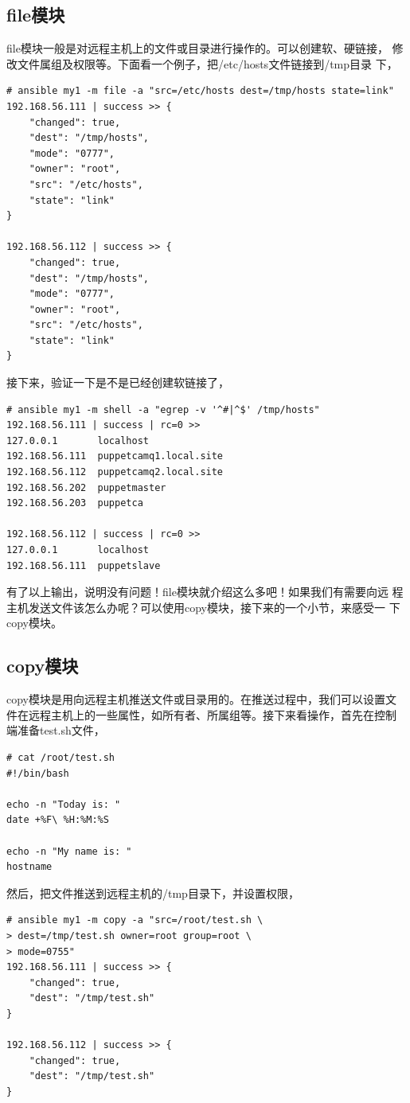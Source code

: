 \subsection{file模块}
\label{sec:AnsibleFileMod}

file模块一般是对远程主机上的文件或目录进行操作的。可以创建软、硬链接，
修改文件属组及权限等。下面看一个例子，把/etc/hosts文件链接到/tmp目录
下，
\begin{verbatim}
# ansible my1 -m file -a "src=/etc/hosts dest=/tmp/hosts state=link"
192.168.56.111 | success >> {
    "changed": true, 
    "dest": "/tmp/hosts", 
    "mode": "0777", 
    "owner": "root", 
    "src": "/etc/hosts", 
    "state": "link"
}

192.168.56.112 | success >> {
    "changed": true, 
    "dest": "/tmp/hosts", 
    "mode": "0777", 
    "owner": "root", 
    "src": "/etc/hosts", 
    "state": "link"
}
\end{verbatim}

接下来，验证一下是不是已经创建软链接了，

\begin{verbatim}
# ansible my1 -m shell -a "egrep -v '^#|^$' /tmp/hosts"
192.168.56.111 | success | rc=0 >>
127.0.0.1	    localhost 
192.168.56.111  puppetcamq1.local.site
192.168.56.112  puppetcamq2.local.site
192.168.56.202  puppetmaster
192.168.56.203  puppetca

192.168.56.112 | success | rc=0 >>
127.0.0.1	    localhost 
192.168.56.111	puppetslave
\end{verbatim}
有了以上输出，说明没有问题！file模块就介绍这么多吧！如果我们有需要向远
程主机发送文件该怎么办呢？可以使用copy模块，接下来的一个小节，来感受一
下copy模块。

\subsection{copy模块}
\label{AnsibleCopyMod}

copy模块是用向远程主机推送文件或目录用的。在推送过程中，我们可以设置文
件在远程主机上的一些属性，如所有者、所属组等。接下来看操作，首先在控制
端准备test.sh文件，
\begin{verbatim}
# cat /root/test.sh 
#!/bin/bash

echo -n "Today is: " 
date +%F\ %H:%M:%S

echo -n "My name is: "
hostname
\end{verbatim}
然后，把文件推送到远程主机的/tmp目录下，并设置权限，
\begin{verbatim}
# ansible my1 -m copy -a "src=/root/test.sh \
> dest=/tmp/test.sh owner=root group=root \
> mode=0755"
192.168.56.111 | success >> {
    "changed": true, 
    "dest": "/tmp/test.sh" 
}

192.168.56.112 | success >> {
    "changed": true, 
    "dest": "/tmp/test.sh" 
}
\end{verbatim}

